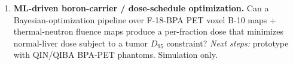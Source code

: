 \begin{enumerate}
  \item \textbf{ML-driven boron-carrier / dose-schedule optimization.}
        Can a Bayesian-optimization pipeline over F-18-BPA PET voxel B-10
        maps + thermal-neutron fluence maps produce a per-fraction dose
        that minimizes normal-liver dose subject to a tumor $D_{95}$
        constraint?
        \emph{Next steps:} prototype with QIN/QIBA BPA-PET phantoms.
        Simulation only.
\end{enumerate}
